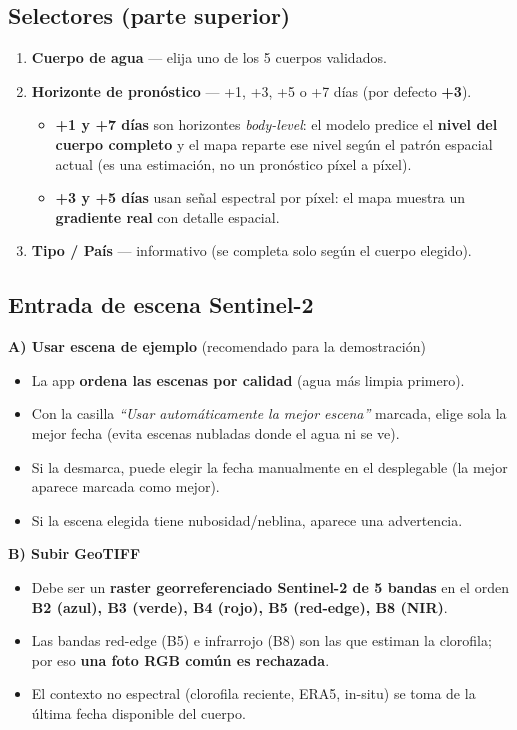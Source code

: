 \documentclass[11pt]{article}
\begin{document}
\subsection{Selectores (parte superior)}
\begin{enumerate}[leftmargin=1.6em]
  \item \textbf{Cuerpo de agua} --- elija uno de los 5 cuerpos validados.
  \item \textbf{Horizonte de pron\'ostico} --- +1, +3, +5 o +7 d\'ias (por defecto \textbf{+3}).
  \begin{itemize}
    \item \textbf{+1 y +7 d\'ias} son horizontes \textit{body-level}: el modelo predice el
    \textbf{nivel del cuerpo completo} y el mapa reparte ese nivel seg\'un el patr\'on
    espacial actual (es una estimaci\'on, no un pron\'ostico p\'ixel a p\'ixel).
    \item \textbf{+3 y +5 d\'ias} usan se\~nal espectral por p\'ixel: el mapa muestra un
    \textbf{gradiente real} con detalle espacial.
  \end{itemize}
  \item \textbf{Tipo / Pa\'is} --- informativo (se completa solo seg\'un el cuerpo elegido).
\end{enumerate}

\subsection{Entrada de escena Sentinel-2}
\textbf{A) Usar escena de ejemplo} (recomendado para la demostraci\'on)
\begin{itemize}
  \item La app \textbf{ordena las escenas por calidad} (agua m\'as limpia primero).
  \item Con la casilla \textit{``Usar autom\'aticamente la mejor escena''} marcada, elige
  sola la mejor fecha (evita escenas nubladas donde el agua ni se ve).
  \item Si la desmarca, puede elegir la fecha manualmente en el desplegable (la mejor
  aparece marcada como mejor).
  \item Si la escena elegida tiene nubosidad/neblina, aparece una advertencia.
\end{itemize}

\textbf{B) Subir GeoTIFF}
\begin{itemize}
  \item Debe ser un \textbf{raster georreferenciado Sentinel-2 de 5 bandas} en el orden
  \textbf{B2 (azul), B3 (verde), B4 (rojo), B5 (red-edge), B8 (NIR)}.
  \item Las bandas red-edge (B5) e infrarrojo (B8) son las que estiman la clorofila; por
  eso \textbf{una foto RGB com\'un es rechazada}.
  \item El contexto no espectral (clorofila reciente, ERA5, in-situ) se toma de la \'ultima
  fecha disponible del cuerpo.
\end{itemize}
\end{document}
